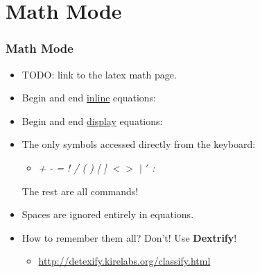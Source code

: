 \documentclass[notes=only]{beamer}
\newcommand{\snip}[1]
{
	
}
\begin{document}
\section{Math Mode}

\begin{frame} \frametitle{Math Mode}
    \begin{itemize}
    	\item TODO: link to the latex math page.
        \item Begin and end \underline{inline} equations: \vspace{-6pt}
        \begin{itemize} \snip{inline.tex} \end{itemize}\vspace{-10pt}
        \item Begin and end \underline{display} equations:
        \begin{itemize} \snip{displayequation.tex} \end{itemize}
        \item The only symbols accessed directly from the keyboard:  
        \begin{itemize} \item \textit{+ - = ! / ( ) [ ] $< >$ $|$ $'$ :} \end{itemize}
        The rest are all commands!
        \item Spaces are ignored entirely in equations.
        \item How to remember them all?  Don't!  Use \textbf{Dextrify}!
        \begin{itemize} \item \url{http://detexify.kirelabs.org/classify.html} \end{itemize}
    \end{itemize}
\end{frame}
\end{document}
